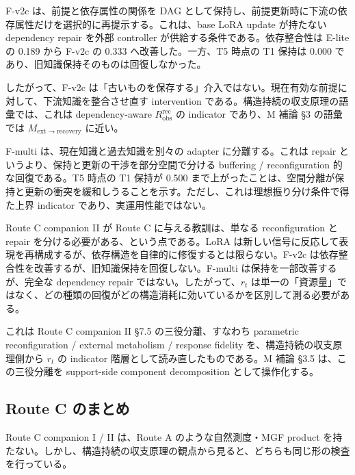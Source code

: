 \documentclass[12pt,a4paper]{article}
\begin{document}
F-v2c は、前提と依存属性の関係を DAG として保持し、前提更新時に下流の依存属性だけを選択的に再提示する。これは、base LoRA update が持たない dependency repair を外部 controller が供給する条件である。依存整合性は E-lite の 0.189 から F-v2c の 0.333 へ改善した。一方、T5 時点の T1 保持は 0.000 であり、旧知識保持そのものは回復しなかった。

したがって、F-v2c は「古いものを保存する」介入ではない。現在有効な前提に対して、下流知識を整合させ直す intervention である。構造持続の収支原理の語彙では、これは dependency-aware \(R_{\mathrm{obs}}^{\mathrm{rec}}\) の indicator であり、M 補論 §3 の語彙では \(M_{\mathrm{ext}\to\mathrm{recovery}}\) に近い。

F-multi は、現在知識と過去知識を別々の adapter に分離する。これは repair というより、保持と更新の干渉を部分空間で分ける buffering / reconfiguration 的な回復である。T5 時点の T1 保持が 0.500 まで上がったことは、空間分離が保持と更新の衝突を緩和しうることを示す。ただし、これは理想振り分け条件で得た上界 indicator であり、実運用性能ではない。

Route C companion II が Route C に与える教訓は、単なる reconfiguration と repair を分ける必要がある、という点である。LoRA は新しい信号に反応して表現を再構成するが、依存構造を自律的に修復するとは限らない。F-v2c は依存整合性を改善するが、旧知識保持を回復しない。F-multi は保持を一部改善するが、完全な dependency repair ではない。したがって、\(r_{t}\) は単一の「資源量」ではなく、どの種類の回復がどの構造消耗に効いているかを区別して測る必要がある。

これは Route C companion II §7.5 の三役分離、すなわち parametric reconfiguration / external metabolism / response fidelity を、構造持続の収支原理側から \(r_{t}\) の indicator 階層として読み直したものである。M 補論 §3.5 は、この三役分離を support-side component decomposition として操作化する。

\subsection{Route C のまとめ}\label{route-c-ux306eux307eux3068ux3081}

Route C companion I / II は、Route A のような自然測度・MGF product を持たない。しかし、構造持続の収支原理の観点から見ると、どちらも同じ形の検査を行っている。
\end{document}

